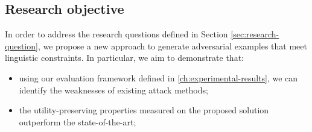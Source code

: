 
\subsection{Research objective}\label{subsec:research-objective}

In order to address the research questions defined in Section \ref{sec:research-question}, 
we propose a new approach to generate adversarial examples that meet linguistic constraints.
In particular, we aim to demonstrate that:
\begin{itemize}
    \item using our evaluation framework defined in \ref{ch:experimental-results}, we can identify the weaknesses of existing attack methods;
    \item the utility-preserving properties measured on the proposed solution outperform the state-of-the-art;
\end{itemize}
 

